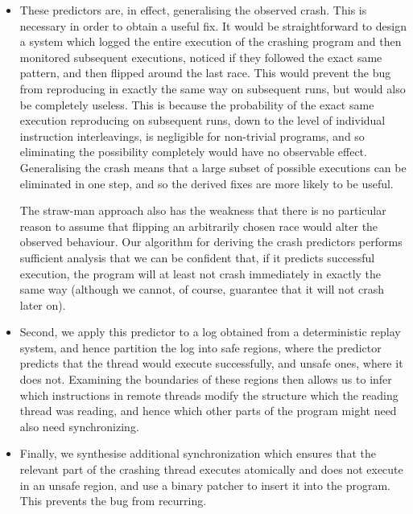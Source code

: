 \begin{itemize}
\item These predictors are, in effect, generalising the observed
  crash.  This is necessary in order to obtain a useful fix.  It would
  be straightforward to design a system which logged the entire
  execution of the crashing program and then monitored subsequent
  executions, noticed if they followed the exact same pattern, and
  then flipped around the last race.  This would prevent the bug from
  reproducing in exactly the same way on subsequent runs, but would
  also be completely useless.  This is because the probability of the
  exact same execution reproducing on subsequent runs, down to the
  level of individual instruction interleavings, is negligible for
  non-trivial programs, and so eliminating the possibility completely
  would have no observable effect.  Generalising the crash means that
  a large subset of possible executions can be eliminated in one step,
  and so the derived fixes are more likely to be useful.

  The straw-man approach also has the weakness that there is no
  particular reason to assume that flipping an arbitrarily chosen race
  would alter the observed behaviour.  Our algorithm for deriving the
  crash predictors performs sufficient analysis that we can be
  confident that, if it predicts successful execution, the program
  will at least not crash immediately in exactly the same way
  (although we cannot, of course, guarantee that it will not crash
  later on).

\item Second, we apply this predictor to a log obtained from a
  deterministic replay system, and hence partition the log into safe
  regions, where the predictor predicts that the thread would execute
  successfully, and unsafe ones, where it does not.  Examining the
  boundaries of these regions then allows us to infer which
  instructions in remote threads modify the structure which the
  reading thread was reading, and hence which other parts of the
  program might need also need synchronizing.
\item Finally, we synthesise additional synchronization which ensures
  that the relevant part of the crashing thread executes atomically
  and does not execute in an unsafe region, and use a binary patcher
  to insert it into the program.  This prevents the bug from
  recurring.
\end{itemize}

